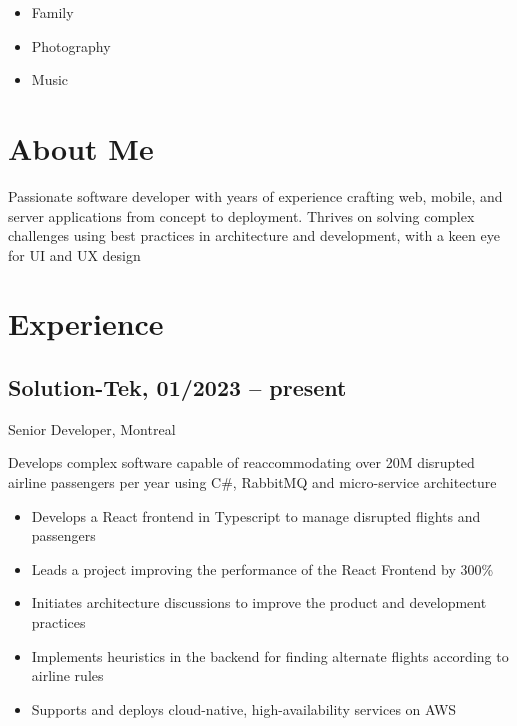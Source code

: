 \documentclass{article}
\begin{document}
\begin{paracol}{2}
\begin{leftcolumn}
    \begin{itemize}
      \item Family
      \item Photography
      \item Music
    \end{itemize}


  \end{leftcolumn}
  \begin{rightcolumn}

    \vspace{-2.5em}
    \section{About Me}

    Passionate software developer with  years of experience
    crafting web, mobile, and server applications from concept to deployment. Thrives
    on solving complex challenges using best practices in architecture and development,
    with a keen eye for UI and UX design

    \section{Experience}

    \subsection{Solution-Tek, 01/2023 -- present}
    {Senior Developer, Montreal\par}
    {
      Develops complex software capable of reaccommodating over 20M disrupted airline passengers per year
      using C\#, RabbitMQ and micro-service architecture
    \par}
    \begin{itemize}
      \item Develops a React frontend in Typescript to manage disrupted flights and passengers
      \item Leads a project improving the performance of the React Frontend by 300\%
      \item Initiates architecture discussions to improve the product and development practices
      \item Implements heuristics in the backend for finding alternate flights according to airline rules
      \item Supports and deploys cloud-native, high-availability services on AWS
    \end{itemize}


\end{rightcolumn}
\end{paracol}
\end{document}
